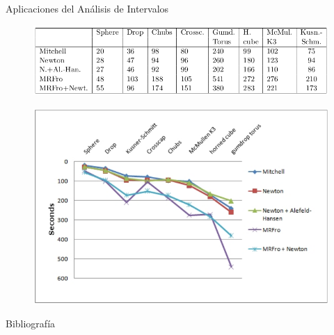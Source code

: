 \documentclass{beamer}
\begin{document}
\begin{frame}{Aplicaciones del Análisis de Intervalos}
\begin{figure}[h]
\centering
\includegraphics[scale=0.3]{images/florez7.png}
\end{figure}
\begin{figure}[h]
\centering
\includegraphics[scale=0.25]{images/florez8.png}
\end{figure}
\end{frame}

\begin{frame}{Bibliografía}
    \tiny
    \nocite{*}
    
    
\end{frame}
\end{document}
